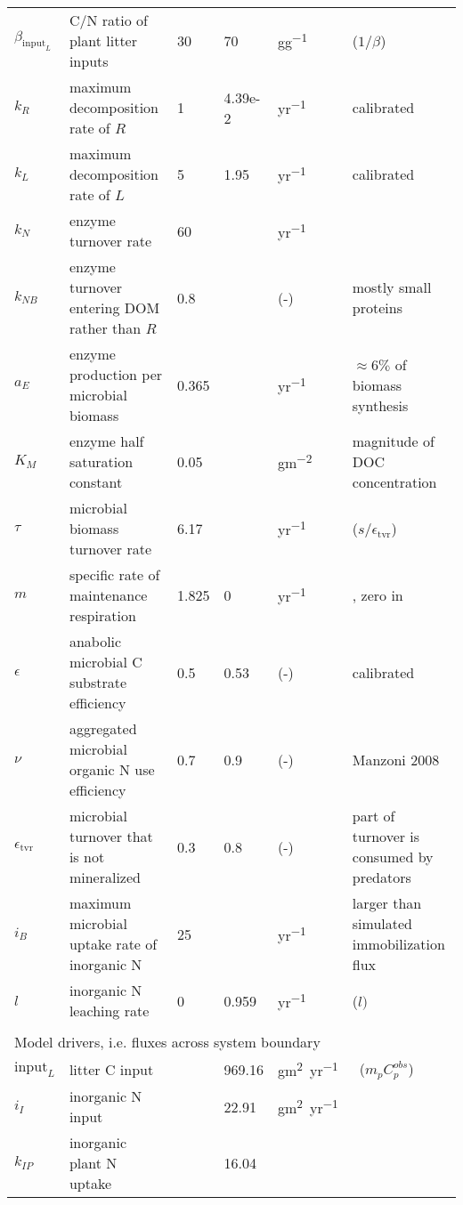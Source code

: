 \begin{table}[t]
\begin{tabular}{lp{6cm}lllp{5.5cm}}
$\beta_{\mathrm{input}_L}$ &  C/N ratio of plant litter inputs & 30 & 70 &
\unit{gg^{-1}} & \citep{Perveen14} ($1/\beta$) \\
$k_R$ &  maximum decomposition rate of $R$ & 1 & 4.39e-2 & \unit{yr^{-1}}
& calibrated \\
$k_L$ &  maximum decomposition rate of $L$ & 5 & 1.95 & \unit{yr^{-1}}
& calibrated \\
$k_N$ &  enzyme turnover rate &  60  & & \unit{yr^{-1}} & \citep{Burns13} \\
$k_{NB}$ & enzyme turnover entering DOM rather than $R$ & 
0.8 & & (-) & mostly small proteins \\
$a_{E}$ &  enzyme production per microbial biomass & 0.365 & &
\unit{yr^{-1}} & $\approx 6\%$ of biomass synthesis \\ 
$K_{M}$ &  enzyme half saturation constant & 0.05 & &
\unit{gm^{-2}} & magnitude of DOC concentration \\
$\tau$ &  microbial biomass turnover rate & 6.17 & & \unit{yr^{-1}} &
\citep{Perveen14} ($s/\epsilon_{\operatorname{tvr}}$) \\
$m$ & specific rate of maintenance respiration & 1.825 & 0 & 
\unit{yr^{-1}} & \citep{Bodegom07}, zero in \citep{Perveen14} \\
$\epsilon$ & anabolic microbial C substrate efficiency & 0.5 & 0.53 &
(-) & calibrated \\ %
$\nu$ & aggregated microbial organic N use efficiency & 0.7 &
0.9 & (-) & Manzoni 2008 \\
$\epsilon_{\operatorname{tvr}}$ & microbial turnover that is not
mineralized & 0.3 & 0.8 & (-) & part of turnover is consumed by
predators
\\
$i_{B}$ & maximum microbial uptake rate of inorganic N & 25 & & \unit{yr^{-1}} 
& larger than simulated immobilization flux \\
$l$ & inorganic N leaching rate & 0 & 0.959 &
\unit{yr^{-1}} & \citep{Perveen14} ($l)$ \\
\\
\multicolumn{6}{l}{Model drivers, i.e. fluxes across system boundary}  \\ 
$\mathrm{input}_{L}$ & litter C input & & 969.16 &
\unit{gm^2yr^{-1}} & \citep{Perveen14} \, ($m_p C^{obs}_p$)\\
$i_{I}$ & inorganic N input & & 22.91 & \unit{gm^2yr^{-1}} 
& \citep{Perveen14} \\
$k_{IP}$ & inorganic plant N uptake & & 16.04 & 

\end{tabular}
\end{table}
